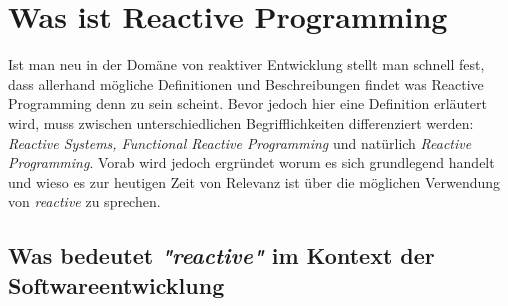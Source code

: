 \chapter{Was ist Reactive Programming}\label{was_ist_reactive_programming}
Ist man neu in der Domäne von reaktiver Entwicklung stellt man schnell fest, dass allerhand mögliche Definitionen und Beschreibungen findet was Reactive Programming denn zu sein scheint. Bevor jedoch hier eine Definition erläutert wird, muss zwischen unterschiedlichen Begrifflichkeiten differenziert werden: \textit{Reactive Systems, Functional Reactive Programming} und natürlich \textit{Reactive Programming}. Vorab wird jedoch ergründet worum es sich grundlegend handelt und wieso es zur heutigen Zeit von Relevanz ist über die möglichen Verwendung von \textit{reactive} zu sprechen.
\section{Was bedeutet \textit{"reactive"} im Kontext der Softwareentwicklung}
